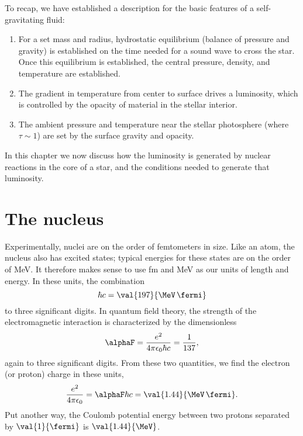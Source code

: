 
\newcommand*{\altnuc}[3]{\ensuremath{\mathrm{_{#1}^{#2}#3}}}
\newcommand*{\nucarule}{\mbox{\rule[-5pt]{3.0em}{1pt}}}

To recap, we have established a description for the basic features of a self-gravitating fluid:
\begin{enumerate}

\item For a set mass and radius, hydrostatic equilibrium (balance of pressure and gravity) is established on the time needed for a sound wave to cross the star. Once this equilibrium is established, the central pressure, density, and temperature are established.

\item The gradient in temperature from center to surface drives a luminosity, which is controlled by the opacity of material in the stellar interior.

\item The ambient pressure and temperature near the stellar photosphere (where $\tau \sim 1$) are set by the surface gravity and opacity.

\end{enumerate}

In this chapter we now discuss how the luminosity is generated by nuclear reactions in the core of a star, and the conditions needed to generate that luminosity.

\section{The nucleus}

Experimentally, nuclei are on the order of femtometers in size. Like an atom, the nucleus also has excited states; typical energies for these states are on the order of MeV. It therefore makes sense to use fm and MeV as our units of length and energy. In these units, the combination
\[	\hbar c = \val{197}{\MeV\,\fermi} \]
to three significant digits. In quantum field theory, the strength of the electromagnetic interaction is characterized by the dimensionless 
\[	\alphaF = \frac{e^{2}}{4\pi\epsilon_{0}\hbar c} = \frac{1}{137}, \]
again to three significant digits. From these two quantities, we find the electron (or proton) charge in these units,
\[
	\frac{e^{2}}{4\pi\epsilon_{0}} = \alphaF\hbar c = \val{1.44}{\MeV\,\fermi}.
\]
Put another way, the Coulomb potential energy between two protons separated by $\val{1}{\fermi}$ is $\val{1.44}{\MeV}$.

